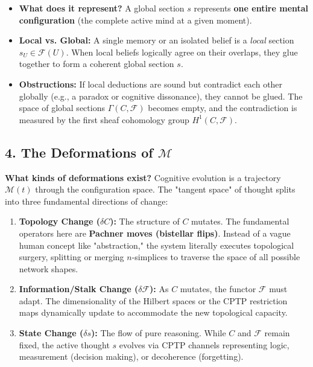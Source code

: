 \documentclass[12pt]{article}
\begin{document}
\begin{itemize}
    \item \textbf{What does it represent?} A global section $s$ represents \textbf{one entire mental configuration} (the complete active mind at a given moment). 
    \item \textbf{Local vs. Global:} A single memory or an isolated belief is a \textit{local} section $s_U \in \mathcal{F}(U)$. When local beliefs logically agree on their overlaps, they glue together to form a coherent global section $s$. 
    \item \textbf{Obstructions:} If local deductions are sound but contradict each other globally (e.g., a paradox or cognitive dissonance), they cannot be glued. The space of global sections $\Gamma(C, \mathcal{F})$ becomes empty, and the contradiction is measured by the first sheaf cohomology group $H^1(C, \mathcal{F})$.
\end{itemize}

\subsection{4. The Deformations of $\mathcal{M}$}
\textbf{What kinds of deformations exist?}
Cognitive evolution is a trajectory $\mathcal{M}(t)$ through the configuration space. The "tangent space" of thought splits into three fundamental directions of change:
\begin{enumerate}
    \item \textbf{Topology Change ($\delta C$):} The structure of $C$ mutates. The fundamental operators here are \textbf{Pachner moves (bistellar flips)}. Instead of a vague human concept like "abstraction," the system literally executes topological surgery, splitting or merging $n$-simplices to traverse the space of all possible network shapes.
    \item \textbf{Information/Stalk Change ($\delta \mathcal{F}$):} As $C$ mutates, the functor $\mathcal{F}$ must adapt. The dimensionality of the Hilbert spaces or the CPTP restriction maps dynamically update to accommodate the new topological capacity.
    \item \textbf{State Change ($\delta s$):} The flow of pure reasoning. While $C$ and $\mathcal{F}$ remain fixed, the active thought $s$ evolves via CPTP channels representing logic, measurement (decision making), or decoherence (forgetting).
\end{enumerate}
\end{document}
